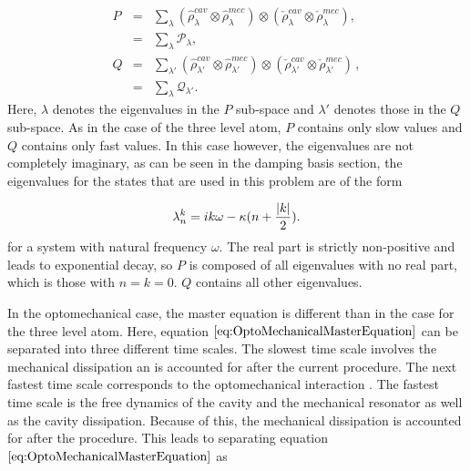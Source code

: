 \documentclass[12pt]{article}
\begin{document}
\begin{eqnarray}\label{eq:optomechanical_projectors_detailed}
  P &=& \sum_{\lambda} (\hat{\rho}_{\lambda}^{cav}\otimes\hat{\rho}_{\lambda}^{mec})\otimes(\check{\rho}_{\lambda}^{cav}\otimes\check{\rho}_{\lambda}^{mec}),\label{eq:projector_p}\\
  &=& \sum_\lambda \mathcal{P}_\lambda, \nonumber\\
  Q &=& \sum_{\lambda'} (\hat{\rho}_{\lambda'}^{cav}\otimes \hat{\rho}_{\lambda'}^{mec})\otimes(\check{\rho}_{\lambda'}^{cav}\otimes\check{\rho}_{\lambda'}^{mec})\label{eq:projector_q}\, ,\\
  &=& \sum_\lambda \mathcal{Q}_{\lambda'}. \nonumber
\end{eqnarray} Here, $\lambda$ denotes the eigenvalues in the $P$ sub-space and $\lambda'$ denotes those in the $Q$ sub-space. As in the case of the three level atom, $P$ contains only slow values and $Q$ contains only fast values. In this case however, the eigenvalues are not completely imaginary, as can be seen in the damping basis section, the eigenvalues for the states that are used in this problem are of the form

\begin{equation}
    \lambda_n^k=ik\omega-\kappa (n+\frac{\abs{k}}{2}).
\end{equation} for a system with natural frequency $\omega$. The real part is strictly non-positive and leads to exponential decay, so $P$ is composed of all eigenvalues with no real part, which is those with $n=k=0$. $Q$ contains all other eigenvalues. 

In the optomechanical case, the master equation is different than in the case for the three level atom. Here, equation $\eqref{eq:OptoMechanicalMasterEquation}$ can be separated into three different time scales. The slowest time scale involves the mechanical dissipation an is accounted for after the current procedure. The next fastest time scale corresponds to the optomechanical interaction . The fastest time scale is the free dynamics of the cavity and the mechanical resonator as well as the cavity dissipation. Because of this, the mechanical dissipation is accounted for after the procedure. This leads to separating equation $\eqref{eq:OptoMechanicalMasterEquation}$ as
\end{document}
